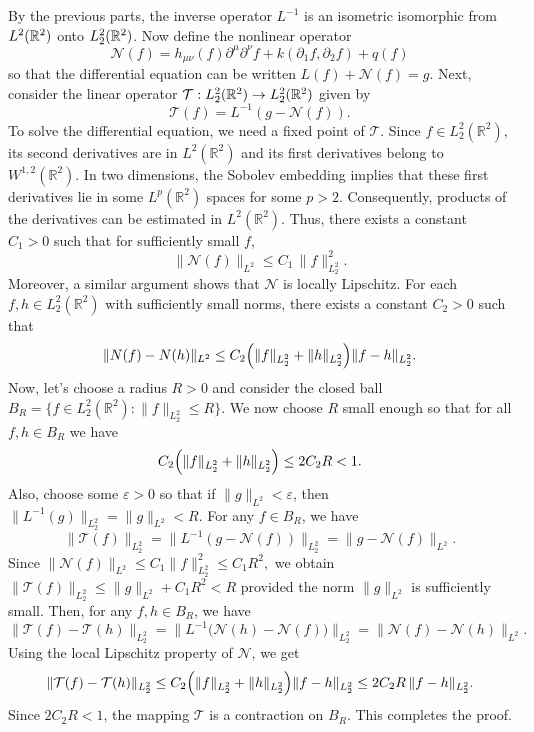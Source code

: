 \documentclass{lkx_pset}
\begin{document}
\begin{parts}
	By the previous parts, the inverse operator $L^{-1}$ is an isometric isomorphic from $L^2(\mathbb{R}^2)$ onto $L^2_2(\mathbb{R}^2)$. Now define the nonlinear operator
	\[
		\mathcal{N}(f) = h_{\mu\nu}(f)\partial^\mu\partial^\nu f + k(\partial_1 f, \partial_2 f) + q(f)
	\]
	so that the differential equation can be written $L(f) + \mathcal{N}(f)=g$. Next, consider the linear operator $\mathcal{T} : L^2_2(\mathbb{R}^2) \to L^2_2(\mathbb{R}^2)$ given by
	\[
		\mathcal{T}(f) = L^{-1}(g-\mathcal{N}(f)).
	\]
	To solve the differential equation, we need a fixed point of $\mathcal{T}$.
	Since $f \in L^2_2(\mathbb{R}^2)$, its second derivatives are in $L^2(\mathbb{R}^2)$ and its first derivatives belong to $W^{1,2}(\mathbb{R}^2)$. In two dimensions, the Sobolev embedding implies that these first derivatives lie in some $L^p(\mathbb{R}^2)$ spaces for some $p>2$. Consequently, products of the derivatives can be estimated in $L^2(\mathbb{R}^2)$.
	Thus, there exists a constant $C_1 > 0$ such that for sufficiently small $f$,
	\[
		\|\mathcal{N}(f)\|_{L^2} \le C_1\, \|f\|_{L^2_2}^2.
	\]
	Moreover, a similar argument shows that $\mathcal{N}$ is locally Lipschitz. For each $f,h\in L^2_2(\mathbb{R}^2)$ with sufficiently small norms, there exists a constant $C_2>0$ such that
	\[
		\|N(f) - N(h)\|_{L^2} \le C_2 \Bigl( \|f\|_{L^2_2} + \|h\|_{L^2_2} \Bigr) \|f-h\|_{L^2_2}.
	\]
	Now, let's choose a radius $R>0$ and consider the closed ball
	$B_R = \{ f \in L^2_2(\mathbb{R}^2) : \|f\|_{L^2_2} \le R \}$.
	We now choose $R$ small enough so that for all $f,h\in B_R$ we have
	\[
		C_2 \Bigl( \|f\|_{L^2_2} + \|h\|_{L^2_2} \Bigr) \le 2C_2 R < 1.
	\]
	Also, choose some $\varepsilon > 0$ so that if $\|g\|_{L^2} < \varepsilon$, then $\|L^{-1}(g)\|_{L^2_2} = \|g\|_{L^2} < R.$
	For any $f\in B_R$, we have
	\[
		\|\mathcal{T}(f)\|_{L^2_2} = \|L^{-1}(g - \mathcal{N}(f))\|_{L^2_2} = \|g - \mathcal{N}(f)\|_{L^2}.
	\]
	Since $\|\mathcal{N}(f)\|_{L^2} \le C_1 \|f\|_{L^2_2}^2 \le C_1 R^2,$ we obtain
	$ \|\mathcal{T}(f)\|_{L^2_2} \le \|g\|_{L^2} + C_1 R^2 < R$ provided the norm $\|g\|_{L^2}$ is sufficiently small.
Then, for any $f, h \in B_R$, we have
\[
  \|\mathcal{T}(f) - \mathcal{T}(h)\|_{L^2_2} = \|L^{-1}\bigl(\mathcal{N}(h) - \mathcal{N}(f)\bigr)\|_{L^2_2} = \|\mathcal{N}(f) - \mathcal{N}(h)\|_{L^2}.
\]
Using the local Lipschitz property of $\mathcal{N}$, we get
\[
\|\mathcal{T}(f) - \mathcal{T}(h)\|_{L^2_2} \le C_2 \Bigl( \|f\|_{L^2_2} + \|h\|_{L^2_2} \Bigr) \|f-h\|_{L^2_2} \le 2C_2 R\,\|f-h\|_{L^2_2}.
\]
Since $2C_2 R < 1$, the mapping $\mathcal{T}$ is a contraction on $B_R$. This completes the proof.
\end{parts}
\end{document}
